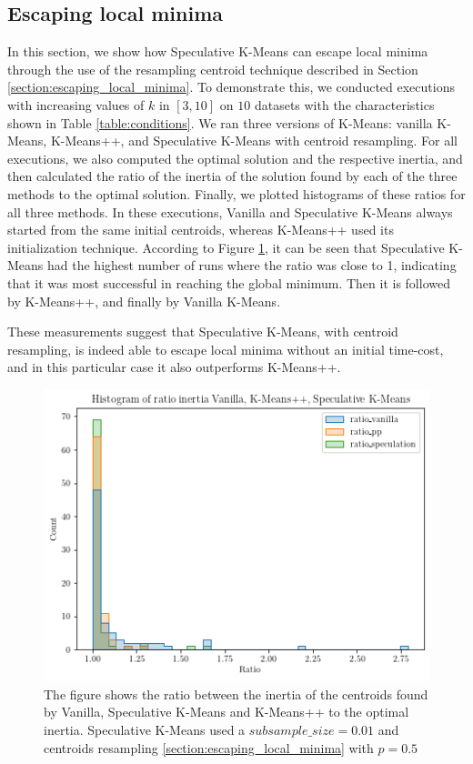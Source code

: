 \subsection{Escaping local minima}
\label{section:evaluation_escaping_local_minima}
In this section, we show how Speculative K-Means can escape local minima through the use of the resampling centroid technique described in Section \ref{section:escaping_local_minima}. To demonstrate this, we conducted executions with increasing values of $k$ in $[3,10]$ on $10$ datasets with the characteristics shown in Table \ref{table:conditions}. We ran three versions of K-Means: vanilla K-Means,  K-Means++, and Speculative K-Means with centroid resampling. For all executions, we also computed the optimal solution and the respective inertia, and then calculated the ratio of the inertia of the solution found by each of the three methods to the optimal solution. Finally, we plotted histograms of these ratios for all three methods. In these executions, Vanilla and Speculative K-Means always started from the same initial centroids, whereas K-Means++ used its initialization technique. According to Figure \ref{fig:histogram_escape_local_minima}, it can be seen that Speculative K-Means had the highest number of runs where the ratio was close to 1, indicating that it was most successful in reaching the global minimum. Then it is followed by K-Means++, and finally by Vanilla K-Means.

These measurements suggest that Speculative K-Means, with centroid resampling, is indeed able to escape local minima without an initial time-cost, and in this particular case it also outperforms K-Means++.

\begin{figure}[h]
\centering
\includegraphics[width=\linewidth]{./plots/histogram_escape_local_minima.png}
\caption{The figure shows the ratio between the inertia of the centroids found by Vanilla, Speculative K-Means and K-Means++ to the optimal inertia. Speculative K-Means used a $subsample\_size=0.01$ and centroids resampling \ref{section:escaping_local_minima} with $p=0.5$}
\label{fig:histogram_escape_local_minima}
\end{figure}

